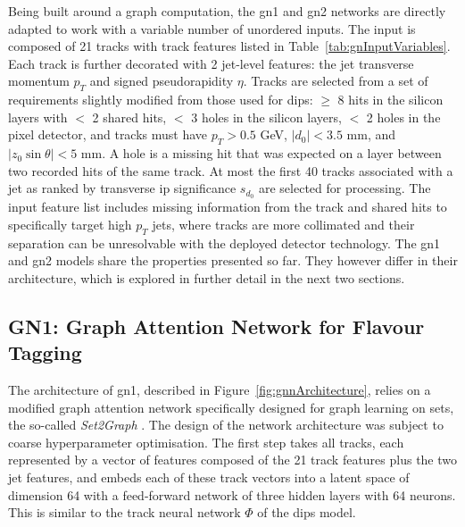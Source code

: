 Being built around a graph computation, the \gls{gn1} and \gls{gn2} networks are directly adapted to work with a variable number of unordered inputs. The input is composed of 21 tracks with track features listed in Table~\ref{tab:gnInputVariables}. Each track is further decorated with 2 jet-level features: the jet transverse momentum $p_T$ and signed pseudorapidity $\eta$. Tracks are selected from a set of requirements slightly modified from those used for \gls{dips}: $\geq$ 8 hits in the silicon layers with $<$ 2 shared hits, $<$ 3 holes in the silicon layers, $<$ 2 holes in the pixel detector, and tracks must have $p_T > 0.5$ GeV, $|d_0| < 3.5$ mm, and $|z_0 \sin\theta| < 5$ mm. A hole is a missing hit that was expected on a layer between two recorded hits of the same track. At most the first 40 tracks associated with a jet as ranked by transverse \gls{ip} significance $s_{d_0}$ are selected for processing. The input feature list includes missing information from the track and shared hits to specifically target high $p_T$ jets, where tracks are more collimated and their separation can be unresolvable with the deployed detector technology. The \gls{gn1} and \gls{gn2} models share the properties presented so far. They however differ in their architecture, which is explored in further detail in the next two sections.

\subsection{GN1: Graph Attention Network for Flavour Tagging}\label{chap-GN1}
The architecture of \gls{gn1}, described in Figure~\ref{fig:gnnArchitecture}, relies on a modified graph attention network \cite{brody2022how} specifically designed for graph learning on sets, the so-called \textit{Set2Graph} \cite{serviansky2020set2graph}. The design of the network architecture was subject to coarse hyperparameter optimisation. The first step takes all tracks, each represented by a vector of features composed of the 21 track features plus the two jet features, and embeds each of these track vectors into a latent space of dimension 64 with a feed-forward network of three hidden layers with 64 neurons. This is similar to the track neural network $\Phi$ of the \gls{dips} model. \\

